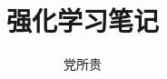 \documentclass[UTF8]{ctexart}
\begin{document}
\author{党所贵}
\title{强化学习笔记}

\maketitle
\tableofcontents
\newpage


\end{document}
